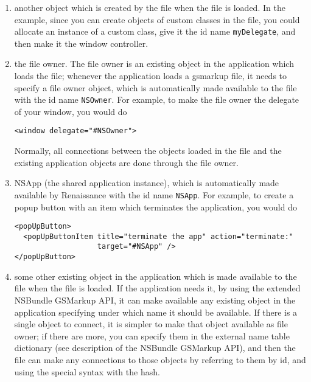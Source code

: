 \begin{enumerate}
\item another object which is created by the file when the file is loaded. 
     In the example, since you can create objects of custom classes in
     the file, you could allocate an instance of a custom class, give
     it the id name \texttt{myDelegate}, and then make it the window
     controller.

\item the file owner.  The file owner is an existing object in the application 
     which loads the file; whenever the application loads a gsmarkup file,
     it needs to specify a file owner object, which is automatically
     made available to the file with the id name \texttt{NSOwner}.
     For example, to make the file owner the delegate of your window,
     you would do
\begin{verbatim}
<window delegate="#NSOwner">
\end{verbatim}
     Normally, all connections between the objects loaded in the file
     and the existing application objects are done through the file
     owner.

\item NSApp (the shared application instance), which is automatically 
     made available by Renaissance with the id name \texttt{NSApp}.
     For example, to create a popup button with an item which
     terminates the application, you would do
\begin{verbatim}
<popUpButton>
  <popUpButtonItem title="terminate the app" action="terminate:"
                   target="#NSApp" />
</popUpButton>
\end{verbatim}

\item some other existing object in the application which is made available 
     to the file when the file is loaded.  If the application needs
     it, by using the extended NSBundle GSMarkup API, it can make
     available any existing object in the application specifying under
     which name it should be available.  If there is a single object
     to connect, it is simpler to make that object available as file
     owner; if there are more, you can specify them in the external
     name table dictionary (see description of the NSBundle GSMarkup
     API), and then the file can make any connections to those objects
     by referring to them by id, and using the special syntax with the
     hash.

\end{enumerate}

